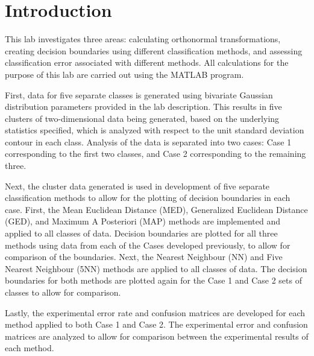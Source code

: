\section{Introduction}
This lab investigates three areas: calculating orthonormal transformations, creating decision boundaries using different classification methods, and assessing classification error associated with different methods. All calculations for the purpose of this lab are carried out using the MATLAB program.

First, data for five separate classes is generated using bivariate Gaussian distribution parameters provided in the lab description. This results in five clusters of two-dimensional data being generated, based on the underlying statistics specified, which is analyzed with respect to the unit standard deviation contour in each class. Analysis of the data is separated into two cases: Case 1 corresponding to the first two classes, and Case 2 corresponding to the remaining three.

Next, the cluster data generated is used in development of five separate classification methods to allow for the plotting of decision boundaries in each case. First, the Mean Euclidean Distance (MED), Generalized Euclidean Distance (GED), and Maximum A Posteriori (MAP) methods are implemented and applied to all classes of data. Decision boundaries are plotted for all three methods using data from each of the Cases developed previously, to allow for comparison of the boundaries. Next, the Nearest Neighbour (NN) and Five Nearest Neighbour (5NN) methods are applied to all classes of data. The decision boundaries for both methods are plotted again for the Case 1 and Case 2 sets of classes to allow for comparison.

Lastly, the experimental error rate and confusion matrices are developed for each method applied to both Case 1 and Case 2. The experimental error and confusion matrices are analyzed to allow for comparison between the experimental results of each method.

